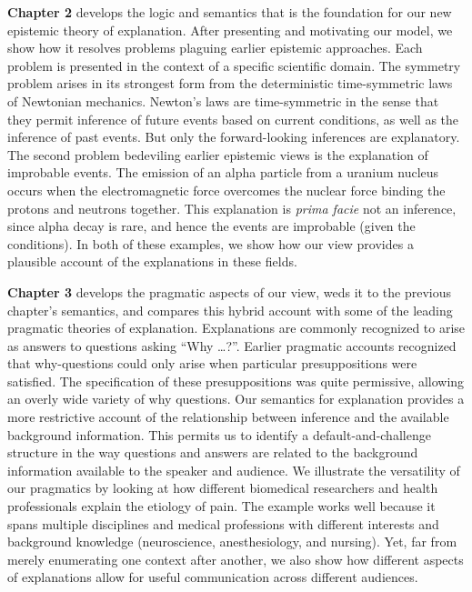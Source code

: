 \documentclass{article}[11pt]
\begin{document}
\textbf{Chapter 2 } develops the logic and semantics that is the foundation for our new epistemic theory of explanation. After presenting and motivating our model, we show how it resolves problems plaguing earlier epistemic approaches.  Each problem is presented in the context of a specific scientific domain.  The symmetry problem arises in its strongest form from the deterministic time-symmetric laws of Newtonian mechanics.   Newton's laws are time-symmetric in the sense that they permit inference of future events based on current conditions, as well as the inference of past events.  But only the forward-looking inferences are explanatory.  The second problem bedeviling earlier epistemic views is the explanation of improbable events.  The emission of an alpha particle from a uranium nucleus occurs when the electromagnetic force overcomes the nuclear force binding the protons and neutrons together.  This explanation is \textit{prima facie} not an inference, since alpha decay is rare, and hence the events are improbable (given the conditions).   In both of these examples, we show how our view provides a plausible account of the explanations in these fields.

\textbf{Chapter 3} develops the pragmatic aspects of our view, weds it to the previous chapter's semantics, and compares this hybrid account with some of the leading pragmatic theories of explanation.  Explanations are commonly recognized to arise as answers to questions asking ``Why \dots?''.   Earlier pragmatic accounts recognized that why-questions could only arise when particular presuppositions were satisfied.  The specification of these presuppositions was quite permissive, allowing an overly wide variety of why questions.  Our semantics for explanation provides a more restrictive account of the relationship between inference and the available background information.  This permits us to identify a default-and-challenge structure in the way questions and answers are related to the background information available to the speaker and audience.  We illustrate the versatility of our pragmatics by looking at how different biomedical researchers and health professionals explain the etiology of pain. The example works well because it spans multiple disciplines and medical professions with different interests and background knowledge (neuroscience, anesthesiology, and nursing).  Yet, far from merely enumerating one context after another, we also show how different aspects of explanations allow for useful communication across different audiences.
\end{document}
